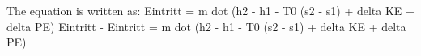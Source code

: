 The equation is written as: 
Eintritt = m dot (h2 - h1 - T0 (s2 - s1) + delta KE + delta PE)
Eintritt - Eintritt = m dot (h2 - h1 - T0 (s2 - s1) + delta KE + delta PE)